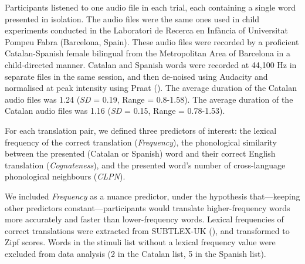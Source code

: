 \documentclass[
]{article}
\begin{document}
Participants listened to one audio file in each trial, each containing a
single word presented in isolation. The audio files were the same ones
used in child experiments conducted in the Laboratori de Recerca en
Infància of Universitat Pompeu Fabra (Barcelona, Spain). These audio
files were recorded by a proficient Catalan-Spanish female bilingual
from the Metropolitan Area of Barcelona in a child-directed manner.
Catalan and Spanish words were recorded at 44,100 Hz in separate files
in the same session, and then de-noised using Audacity and normalised at
peak intensity using Praat (). The average duration of the Catalan audio files was
1.24 (\emph{SD} = 0.19, Range = 0.8-1.58). The average duration of the
Catalan audio files was 1.16 (\emph{SD} = 0.15, Range = 0.78-1.53).

For each translation pair, we defined three predictors of interest: the
lexical frequency of the correct translation (\emph{Frequency}), the
phonological similarity between the presented (Catalan or Spanish) word
and their correct English translation (\emph{Cognateness}), and the
presented word's number of cross-language phonological neighbours
(\emph{CLPN}).

We included \emph{Frequency} as a nuance predictor, under the hypothesis
that---keeping other predictors constant---participants would translate
higher-frequency words more accurately and faster than lower-frequency
words. Lexical frequencies of correct translations were extracted from
SUBTLEX-UK (), and
transformed to Zipf scores. Words in the stimuli list without a lexical
frequency value were excluded from data analysis (2 in the Catalan list,
5 in the Spanish list).
\end{document}
